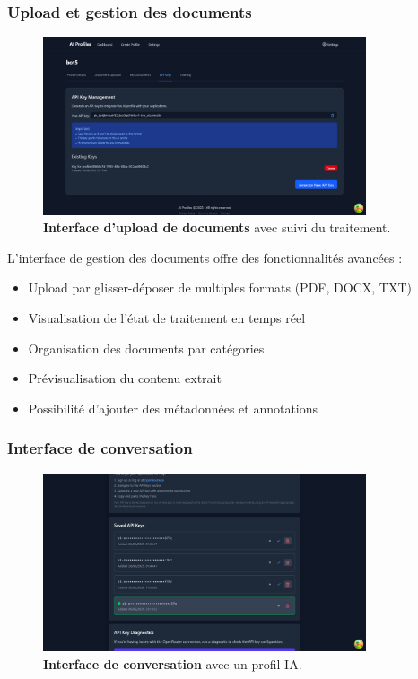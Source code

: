 \subsubsection{Upload et gestion des documents}

\begin{figure}[H]
  \centering
  \includegraphics[width=0.85\textwidth,keepaspectratio]{pfe-pics/ai-profile-creation/Screenshot 2025-06-09 at 23-17-46 Vite React TS.png}
  \caption{\textbf{Interface d'upload de documents} avec suivi du traitement.}
  \label{fig:document_upload}
\end{figure}

L'interface de gestion des documents offre des fonctionnalités avancées :

\begin{itemize}
  \item Upload par glisser-déposer de multiples formats (PDF, DOCX, TXT)
  \item Visualisation de l'état de traitement en temps réel
  \item Organisation des documents par catégories
  \item Prévisualisation du contenu extrait
  \item Possibilité d'ajouter des métadonnées et annotations
\end{itemize}

\subsubsection{Interface de conversation}

\begin{figure}[H]
  \centering
  \includegraphics[width=0.85\textwidth,keepaspectratio]{pfe-pics/ai-profile-creation/Screenshot 2025-06-09 at 23-19-55 Vite React TS.png}
  \caption{\textbf{Interface de conversation} avec un profil IA.}
  \label{fig:conversation_interface}
\end{figure}

